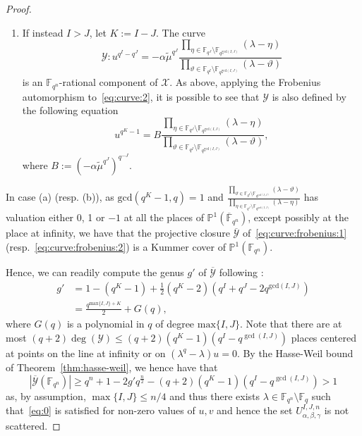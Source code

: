 \begin{proof}
\begin{enumerate}
\item If instead $I > J$, let $K:=I - J$. The curve
\begin{equation}
\label{eq:curve:2}
    \mathcal{Y}: u^{q^I-q^J} = -\alpha \tilde{\mu}^{q^J}\frac{\prod_{\eta\in \mathbb{F}_{q^J}\setminus \mathbb{F}_{q^{\mathrm{gcd}(I,J)}}}\left(\lambda - \eta\right)}{\prod_{\vartheta\in \mathbb{F}_{q^I}\setminus \mathbb{F}_{q^{\mathrm{gcd}(I,J)}}}\left(\lambda - \vartheta\right)} 
\end{equation}
is an $\mathbb{F}_{q^n}$-rational component of $\mathcal{X}$.
As above, applying the Frobenius automorphism to~\eqref{eq:curve:2}, it is possible to see that $\mathcal{Y}$ is also defined by the following equation
\begin{equation}
    \label{eq:curve:frobenius:2}
    u^{q^K-1} = B \frac{\prod_{\eta\in \mathbb{F}_{q^J}\setminus \mathbb{F}_{q^{\mathrm{gcd}(I,J)}}}\left(\lambda - \eta\right)}{\prod_{\vartheta\in \mathbb{F}_{q^I}\setminus \mathbb{F}_{q^{\mathrm{gcd}(I,J)}}}\left(\lambda - \vartheta\right)}, 
\end{equation}
where $B:=\left(-\alpha\tilde{\mu}^{q^J}\right)^{q^{-J}}$.
\end{enumerate}


In case (a) (resp. (b)), as $\mathrm{gcd}(q^K-1,q)=1$ and $\frac{\prod_{\vartheta\in \mathbb{F}_{q^I}\setminus \mathbb{F}_{q^{\mathrm{gcd}(I,J)}}}\left(\lambda - \vartheta\right)}{\prod_{\eta\in \mathbb{F}_{q^J}\setminus \mathbb{F}_{q^{\mathrm{gcd}(I,J)}}}\left(\lambda - \eta\right)}$ has valuation either 0, 1 or $-1$ at all the places of $\mathbb{P}^1(\overline{\mathbb{F}}_{q^n})$, except possibly at the place at infinity, we have that the projective closure $\overline{\mathcal{Y}}$ of~\eqref{eq:curve:frobenius:1} (resp.~\eqref{eq:curve:frobenius:2}) is a Kummer cover of $\mathbb{P}^1(\mathbb{F}_{q^n})$.

Hence, we can readily compute the genus $g'$ of $\overline{\mathcal{Y}}$ following \cite[Corollary 3.7.4]{Stichtenoth}:
\begin{equation*}
\begin{split}
    g' &= 1 - (q^K-1) + \frac{1}{2}\left(q^K - 2\right)\left(q^I + q^J - 2q^{\mathrm{gcd}(I,J)}\right)\\
    &= \frac{q^{\mathrm{max}\{I,J\}+K}}{2} + G(q),
\end{split}
\end{equation*}
where $G(q)$ is a polynomial in $q$ of degree  $\mathrm{max}\{I,J\}$. Note that there are at most $(q+2)\deg(\mathcal{Y})\leq (q+2)(q^K-1)(q^I-q^{\gcd(I,J)})$ places centered at points on the line at infinity or on $(\lambda^q-\lambda)u=0$.
By the Hasse-Weil bound of Theorem~\ref{thm:hasse-weil}, we hence have that 
\begin{equation*}
    |\overline{\mathcal{Y}}(\mathbb{F}_{q^n})| \geq q^n +1 -2g'q^{\frac{n}{2}} -(q+2)(q^K-1)(q^I-q^{\gcd(I,J)})>1
\end{equation*}
as, by assumption, $\max\{I,J\}\leq n/4$ and thus there exists  $\lambda\in \mathbb{F}_{q^n}\setminus\mathbb{F}_q$ such that~\eqref{eq:0} is satisfied for non-zero values of $u,v$ and hence the set $U_{\alpha, \beta, \gamma}^{I,J,n}$ is not scattered.
\end{proof}
